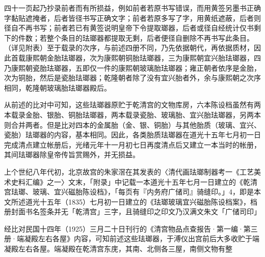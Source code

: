 \vfill
\begin{BookNotes}
\end{BookNotes}

\noindent 四十一页起乃抄录前者而有所损益，例如前者若原书写错误，而用黄签另墨书正确字黏贴遮掩者，后者皆径书写正确文字；前者若原多写了字，用黄纸遮蔽，后者则径自不再书写；前者若已有黄签说明皇帝下令提取瑯器，后者或径自经统计仅书剩下的件数；若整个条目的珐瑯器都提取无剩，后者便径自删除不再书写此条目。（详见附表）至于载录的次序，与前述四册不同，乃先依据朝代，再依据质材，因此首载康熙朝金胎珐瑯器，次为康熙朝铜胎珐瑯器，三为康熙朝宜兴胎珐瑯器，四乃康熙朝瓷胎珐瑯器，五即仅一件的康熙朝玻璃胎珐瑯器；雍正朝者依序是金胎，次为铜胎，然后是瓷胎珐瑯器；乾隆朝者除了没有宜兴胎者外，余与康熙朝之次序相同，乾隆朝玻璃胎珐瑯器殿后。

从前述的比对中可知，这些珐瑯器原贮于乾清宫的文物库房，六本陈设档虽然有两本载录金胎、银胎、铜胎珐瑯器，两本载录瓷胎、玻璃胎、宜兴胎珐瑯器，另两本则合并两者。但是比对四本的金属胎（金、银、铜胎）与其他胎质（玻璃、宜兴、瓷胎）珐瑯器的内容，基本相同。因此，各类胎质珐瑯器在道光十五年七月初一日完成清点建立帐册后，光绪元年十一月初七日再度清点后又建立一本当时的帐册，其间珐瑯器除皇帝传旨赏赐外，并无损益。

上个世纪八年代初，北京故宫的朱家滘在其发表的〈清代画珐瑯制器考一《工艺美术史料汇编》之一〉文末，「附录」中记载一本道光十五年七月一日建立的《乾清宫珐瑯、玻璃、宜兴磁胎陈设档》，「每页有『内务府广储司』骑缝印。」4，即是本文所述道光十五年（1835）七月初一日建立的《珐瑯玻璃宜兴磁胎陈设档案》，档册封面书名签条并无「乾清宫」三字，且骑缝印之印文乃汉满文朱文「广储司印」

经比对民国十四年（1925）三月二十日刊行的《清宫物品点查报告·第一编·第三册·端凝殿左右各屋》内容，可知前述这些珐瑯器，于溥仪出宫前后大多收贮于端凝殿左右各屋。端凝殿在乾清宫东庑，其南、北侧各三屋，南侧文物有整

\vfill
\begin{BookNotes}
\end{BookNotes}


